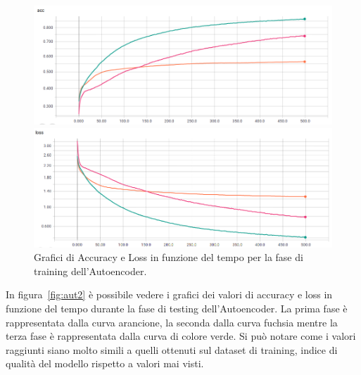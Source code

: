 \begin{figure}[!bp]
    \centering
    \begin{minipage}[t]{\linewidth}
    	\includegraphics[width=\linewidth]{figures/autoenc.png}
    \end{minipage}\hfill
    \begin{minipage}[b]{\linewidth}
    	\includegraphics[width=\linewidth]{figures/autoenc2.png}
    \end{minipage}
    \caption{Grafici di Accuracy e Loss in funzione del tempo per la fase di training dell'Autoencoder. \label{fig:aut1}}
\end{figure}

In figura~\ref{fig:aut2} è possibile vedere i grafici dei valori di accuracy e loss in funzione del tempo durante la fase di testing dell'Autoencoder.  La prima fase è rappresentata dalla curva arancione, la seconda dalla curva fuchsia mentre la terza fase è rappresentata dalla curva di colore verde. Si può notare come i valori raggiunti siano molto simili a quelli ottenuti sul dataset di training, indice di qualità del modello rispetto a valori mai visti.


